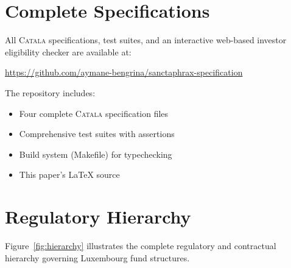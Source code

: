 \documentclass[10pt,twocolumn]{article}
\newcommand{\catala}{\textsc{Catala}}
\begin{document}














\appendix
\section{Complete Specifications}
\label{app:code}

All \catala{} specifications, test suites, and an interactive web-based investor eligibility checker are available at:

\begin{center}
\url{https://github.com/aymane-bengrina/sanctaphrax-specification}
\end{center}

The repository includes:
\begin{itemize}[nosep,leftmargin=1.5em]
  \item Four complete \catala{} specification files
  \item Comprehensive test suites with assertions
  \item Build system (Makefile) for typechecking
  \item This paper's \LaTeX{} source
\end{itemize}

\section{Regulatory Hierarchy}
\label{app:graph}

Figure~\ref{fig:hierarchy} illustrates the complete regulatory and contractual hierarchy governing Luxembourg fund structures.


\end{document}
